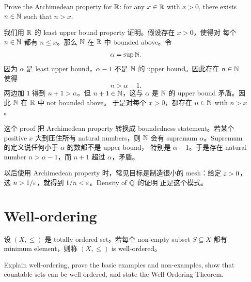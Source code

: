\begin{exerciseblock}
Prove the Archimedean property for \(\mathbb{R}\): for any \(x\in\mathbb{R}\) with \(x>0\),
there exists \(n\in\mathbb{N}\) such that \(n>x\).
\end{exerciseblock}

\begin{solution}
我们用 \(\mathbb{R}\) 的 least upper bound property 证明。假设存在 \(x>0\)，使得对
每个 \(n\in\mathbb{N}\) 都有 \(n\le x\)。那么 \(\mathbb{N}\) 在 \(\mathbb{R}\) 中 bounded above。令
\[
  \alpha=\sup\mathbb{N}.
\]
因为 \(\alpha\) 是 least upper bound，\(\alpha-1\) 不是 \(\mathbb{N}\) 的 upper
bound。因此存在 \(n\in\mathbb{N}\) 使得
\[
  n>\alpha-1.
\]
两边加 \(1\) 得到 \(n+1>\alpha\)。但 \(n+1\in\mathbb{N}\)，这与 \(\alpha\) 是
\(\mathbb{N}\) 的 upper bound 矛盾。因此 \(\mathbb{N}\) 在 \(\mathbb{R}\) 中 not bounded above。
于是对每个 \(x>0\)，都存在 \(n\in\mathbb{N}\) with \(n>x\)。
\end{solution}

\begin{explanation}
这个 proof 把 Archimedean property 转换成 boundedness statement。若某个
positive \(x\) 大到压住所有 natural numbers，则 \(\mathbb{N}\) 会有 supremum
\(\alpha\)。Supremum 的定义说任何小于 \(\alpha\) 的数都不是 upper bound，
特别是 \(\alpha-1\)。于是存在 natural number \(n>\alpha-1\)，而 \(n+1\)
超过 \(\alpha\)，矛盾。

以后使用 Archimedean property 时，常见目标是制造很小的 mesh：给定
\(\varepsilon>0\)，选 \(n>1/\varepsilon\)，就得到 \(1/n<\varepsilon\)。Density of \(\mathbb{Q}\) 的证明
正是这个模式。
\end{explanation}

\section{Well-ordering \optional}

\begin{definition}
设 \((X,\le)\) 是 totally ordered set。若每个 non-empty subset
\(S\subseteq X\) 都有 minimum element，则称 \((X,\le)\) is well-ordered。
\end{definition}

\begin{exerciseblock}
Explain well-ordering, prove the basic examples and non-examples, show that
countable sets can be well-ordered, and state the Well-Ordering Theorem.
\end{exerciseblock}


